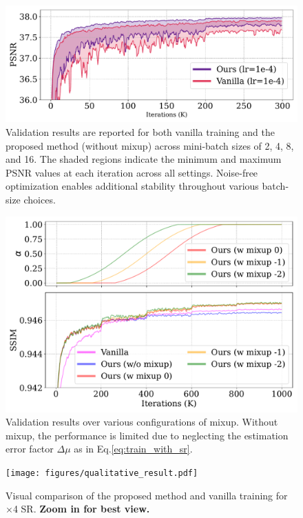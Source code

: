 \documentclass[letterpaper]{article} %
\begin{document}
\begin{figure}[h]
    \includegraphics[width=\columnwidth]{figures/different_batch_size.pdf}
    \caption{
    Validation results are reported for both vanilla training and the proposed method (without mixup) across mini-batch sizes of 2, 4, 8, and 16. The shaded regions indicate the minimum and maximum PSNR values at each iteration across all settings. Noise-free optimization enables additional stability throughout various batch-size choices.
    }
    \label{fig:different_batch_size}
\end{figure}

%

\begin{figure}[h]
    \includegraphics[width=\columnwidth]{figures/longer_training.pdf}
    \caption{
    Validation results over various configurations of mixup. Without mixup, the performance is limited due to neglecting the estimation error factor $\Delta\mu$ as in Eq.\eqref{eq:train_with_sr}.
    }
    \label{fig:longer_training}
\end{figure}



\begin{figure}[t]
    \texttt{[image: figures/qualitative\_result.pdf]}
    \caption{
    Visual comparison of the proposed method and vanilla training for $\times$4 SR. \textbf{Zoom in for best view.}
    }
    \label{fig:qualitative_result}
\end{figure}
\end{document}
